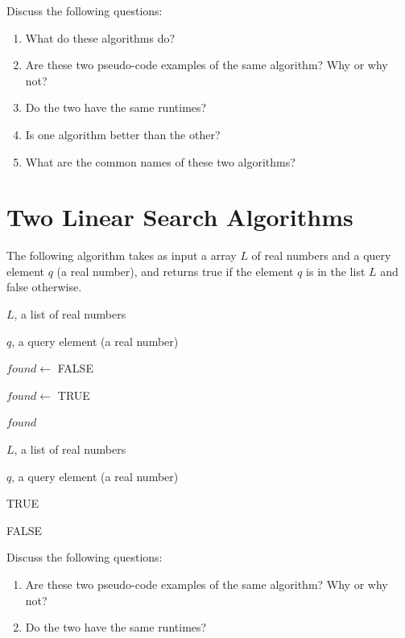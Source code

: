 \documentclass{article}
\begin{document}
Discuss the following questions:

\begin{enumerate}
    \item What do these algorithms do?
    \item Are these two pseudo-code examples of the same algorithm? Why or why
        not?
    \item Do the two have the same runtimes?
    \item Is one algorithm better than the other?
    \item What are the common names of these two algorithms?
\end{enumerate}



\pagebreak
\section*{Two Linear Search Algorithms}

The following algorithm takes as input a array $L$ of real numbers
and a query element $q$ (a real number), and returns
true if the element $q$ is in the list $L$ and false otherwise.

\begin{algorithm}[h]
    \caption{Linear Search II}
    \begin{algorithmic}[1]
        \REQUIRE $L$, a list of real numbers

        \ENSURE $q$, a query element (a real number)

        \STATE $found \gets$ FALSE

                \STATE $found \gets$ TRUE
            \ENDIF
        \ENDFOR

        \RETURN $found$

    \end{algorithmic}
\end{algorithm}

\begin{algorithm}[h]
    \caption{Linear Search II}
    \begin{algorithmic}[1]
        \REQUIRE $L$, a list of real numbers

        \ENSURE $q$, a query element (a real number)

                \RETURN TRUE
            \ENDIF
        \ENDFOR

        \RETURN FALSE

    \end{algorithmic}
\end{algorithm}


Discuss the following questions:

\begin{enumerate}
    \item Are these two pseudo-code examples of the same algorithm? Why or why
        not?
    \item Do the two have the same runtimes?
\end{enumerate}
\end{document}
